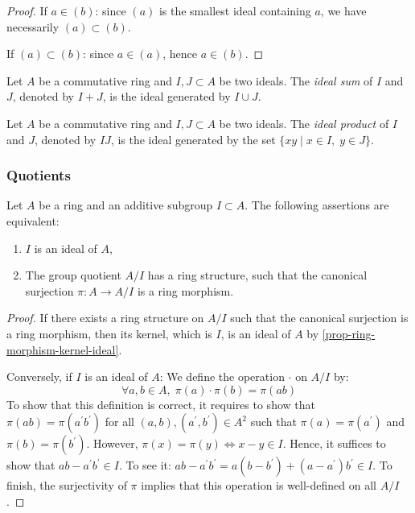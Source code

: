 \documentclass[12pt]{report}
\begin{document}
\begin{proof}
    If $a \in (b)$: since $(a)$ is the smallest ideal containing $a$, we have necessarily $(a) \subset (b)$.

    If $(a) \subset (b)$: since $a \in (a)$, hence $a \in (b)$.
\end{proof}

\begin{definition} \label{def-ring-ideals-sum}
    Let $A$ be a commutative ring and $I, J \subset A$ be two ideals. The \emph{ideal sum} of $I$ and $J$, denoted by $I + J$, is the ideal generated by $I \cup J$.
\end{definition}

\begin{definition} \label{def-ring-ideals-product}
    Let $A$ be a commutative ring and $I, J \subset A$ be two ideals. The \emph{ideal product} of $I$ and $J$, denoted by $IJ$, is the ideal generated by the set $\lbrace xy \mid x \in I, \; y \in J \rbrace$.
\end{definition}

\subsubsection{Quotients}

\begin{proposition}
    Let $A$ be a ring and an additive subgroup $I \subset A$. The following assertions are equivalent:
    \begin{enumerate}[label=(\roman*)]
        \item $I$ is an ideal of $A$,
        \item The group quotient $A / I$ has a ring structure, such that the canonical surjection $\pi \colon A \longrightarrow A / I$ is a ring morphism.
    \end{enumerate}
\end{proposition}

\begin{proof}
    If there exists a ring structure on $A / I$ such that the canonical surjection is a ring morphism, then its kernel, which is $I$, is an ideal of $A$ by \ref{prop-ring-morphism-kernel-ideal}. 
    
    Conversely, if $I$ is an ideal of $A$: We define the operation $\cdot$ on $A / I$ by:
    \[
        \forall a, b \in A, \; \pi(a) \cdot \pi(b) = \pi(ab)
    \]
    To show that this definition is correct, it requires to show that $\pi(ab) = \pi(a^{\prime} b^{\prime})$ for all $(a, b), (a^{\prime}, b^{\prime}) \in A^2$ such that $\pi(a) = \pi(a^{\prime})$ and $\pi(b) = \pi(b^{\prime})$. However, $\pi(x) = \pi(y) \iff x - y \in I$. Hence, it suffices to show that $ab - a^{\prime} b^{\prime} \in I$. To see it: $ab - a^{\prime} b^{\prime} = a(b - b^{\prime}) + (a - a^{\prime})b^{\prime} \in I$. To finish, the surjectivity of $\pi$ implies that this operation is well-defined on all $A / I$.
\end{proof}
\end{document}
